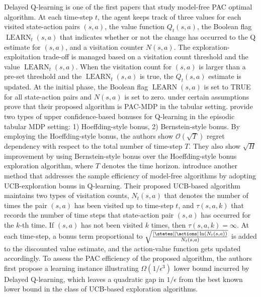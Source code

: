 Delayed Q-learning  is one of the first papers that study model-free PAC optimal algorithm. At each time-step $t$, the agent keeps track of three values for each visited state-action pairs $(s,a)$, the value function $Q_t(s,a)$, the Boolean flag $\operatorname{LEARN}_t(s,a)$ that indicates whether or not the change has occurred to the Q estimate for $(s,a)$, and a visitation counter $N(s,a)$. The exploration-exploitation trade-off is managed based on a visitation count threshold and the value $\operatorname{LEARN}_t(s,a)$. When the visitation count for $(s,a)$ is larger than a pre-set threshold and the $\operatorname{LEARN}_t(s,a)$ is true, the $Q_t(s,a)$ estimate is updated. At the initial phase, the Boolean flag $\operatorname{LEARN}(s,a)$ is set to TRUE for all state-action pairs and $N(s,a)$ is set to zero.  under certain assumptions prove that their proposed algorithm is PAC-MDP in the tabular setting.
 provide two types of upper confidence-based bonuses for Q-learning in the episodic tabular MDP setting: 1) Hoeffding-style bonus, 2) Bernstein-style bonus. By employing the Hoeffding-style bonus, the authors show $\mathcal{O}(\sqrt{T})$ regret dependency with respect to the total number of time-step $T$. They also show $\sqrt{H}$ improvement by using Bernstein-style bonus over the Hoeffding-style bonus exploration algorithm, where $T$ denotes the time horizon.
 introduce another method that addresses the sample efficiency of model-free algorithms by adopting UCB-exploration bonus in Q-learning.  Their proposed UCB-based algorithm maintains two types of visitation counts, $N_t(s,a)$ that denotes the number of times the pair $(s,a)$ has been visited up to time-step $t$, and $\tau(s,a,k)$ that records the number of time steps that state-action pair $(s,a)$ has occurred for the $k$-th time. If $(s,a)$ has not been visited $k$ times, then $\tau(s,a,k) = \infty$. At each time-step, a bonus term proportional to $\sqrt{\frac{|\states||\actions|\ln(N_t(s,a))}{N_t(s,a)}}$ is added to the discounted value estimate, and the action-value function gets updated accordingly. To assess the PAC efficiency of the proposed algorithm, the authors first propose a learning instance illustrating $\Omega(1/\epsilon^3)$ lower bound incurred by Delayed Q-learning, which leaves a quadratic gap in $1/\epsilon$ from the best known lower bound in the class of UCB-based exploration algorithms.

